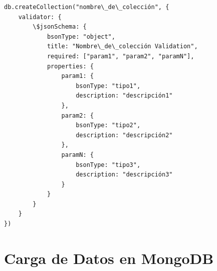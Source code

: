 \documentclass[]{article}
\begin{document}
\lstset{style=bash}
\begin{lstlisting}
db.createCollection("nombre\_de\_colección", {
    validator: {
        \$jsonSchema: {
            bsonType: "object",
            title: "Nombre\_de\_colección Validation",
            required: ["param1", "param2", "paramN"],
            properties: {
                param1: {
                    bsonType: "tipo1",
                    description: "descripción1"
                },
                param2: {
                    bsonType: "tipo2",
                    description: "descripción2"
                },
                paramN: {
                    bsonType: "tipo3",
                    description: "descripción3"
                }
            }
        }
    }
})
\end{lstlisting}

\newpage
\section{Carga de Datos en MongoDB}
\label{sec:mondongo}
\end{document}
